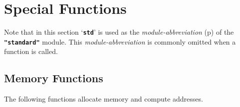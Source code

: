 \documentclass[12pt]{article}
\newcommand{\TT}[1]{{\tt \bfseries #1}}
\newcommand{\pagref}[1]{p\pageref{#1}}
\begin{document}
\section{Special Functions}
\label{SPECIAL-FUNCTIONS}

Note that in this section `\TT{std}' is used as the
{\em module-abbreviation} (\pagref{MODULE-ABBREVIATION})
of the \TT{"standard"} module.
This {\em module-abbreviation} is commonly omitted when
a function is called.

\subsection{Memory Functions}
\label{MEMORY-FUNCTIONS}

The following functions allocate memory and compute addresses.
\end{document}
